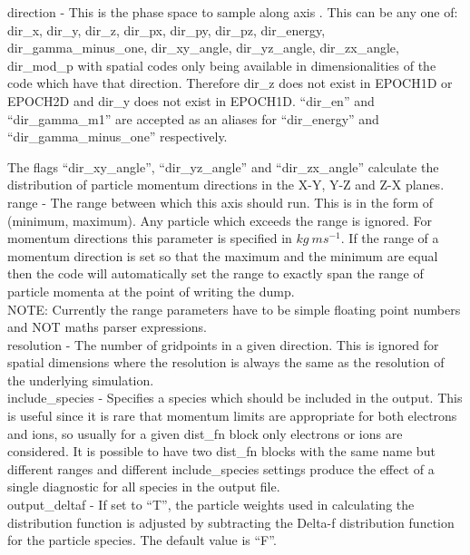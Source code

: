 {\emphtext direction} - This is the phase space to sample
along axis . This can be any one of:
dir\_x, dir\_y, dir\_z, dir\_px, dir\_py, dir\_pz, dir\_energy,
dir\_gamma\_minus\_one, dir\_xy\_angle, dir\_yz\_angle, dir\_zx\_angle,
dir\_mod\_p
with spatial codes only being available in dimensionalities of the code which
have that direction. Therefore dir\_z does not exist in EPOCH1D or EPOCH2D
and dir\_y does not exist in EPOCH1D. ``dir\_en'' and ``dir\_gamma\_m1''
are accepted as an aliases for ``dir\_energy'' and ``dir\_gamma\_minus\_one''
respectively.

The flags ``dir\_xy\_angle'', ``dir\_yz\_angle'' and
``dir\_zx\_angle'' calculate the distribution
of particle momentum directions in the X-Y, Y-Z and Z-X planes.\\

{\emphtext range} - The range between which this axis should
run. This is in the form of (minimum, maximum). Any particle which exceeds
the range is ignored.
For momentum directions this parameter is specified in
$kg\ ms^{-1}$. If the range of a momentum direction is set so that the maximum
and the minimum are equal then the code will automatically set the range to
exactly span the range of particle momenta at the point of writing the dump.\\

{\emphtext NOTE: Currently the range parameters have to be simple floating
point numbers and NOT maths parser expressions.}\\

{\emphtext resolution} - The number of gridpoints in a given
direction. This is ignored for spatial dimensions where the
resolution is always the same as the resolution of the underlying simulation.\\

{\emphtext include\_species} - Specifies a species which should be included
in the output. This is useful since it is rare that momentum limits are
appropriate for both electrons and ions, so usually for a given dist\_fn block
only electrons or ions are considered. It is possible to have two dist\_fn
blocks with the same name but different ranges and different
include\_species settings produce the effect of a single diagnostic for
all species in the output file.\\

{\emphtext output\_deltaf} - If set to ``T'', the particle weights used in
  calculating the distribution function is adjusted by subtracting the Delta-f
  distribution function for the particle species. The default value is ``F''.\\

